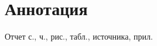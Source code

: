 
\chapter*{Аннотация}

    Отчет \pageref{LastPage} с.,   %
     ч.,           %
    \totalfigures{} рис.,          %
    \totaltables{} табл.,          %
     источника,  %
     прил.       %
    
    \lipsum[1]
    
